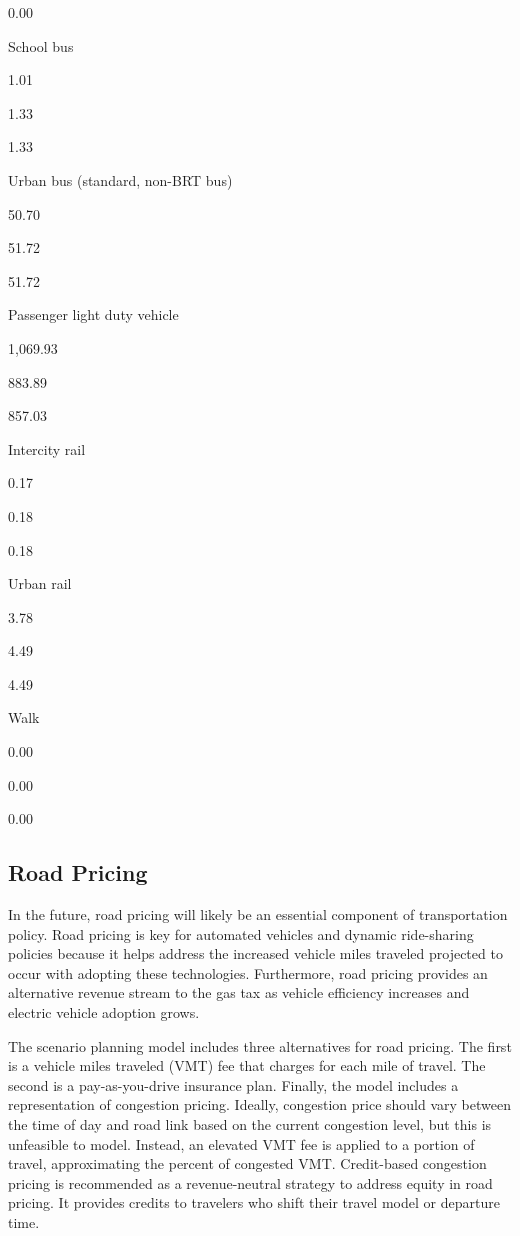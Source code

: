 \documentclass[
]{book}
\begin{document}
0.00

School bus

1.01

1.33

1.33

Urban bus (standard, non-BRT bus)

50.70

51.72

51.72

Passenger light duty vehicle

1,069.93

883.89

857.03

Intercity rail

0.17

0.18

0.18

Urban rail

3.78

4.49

4.49

Walk

0.00

0.00

0.00

\hypertarget{road-pricing}{%
\subsection{Road Pricing}\label{road-pricing}}

In the future, road pricing will likely be an essential component of transportation policy. Road pricing is key for automated vehicles and dynamic ride-sharing policies because it helps address the increased vehicle miles traveled projected to occur with adopting these technologies. Furthermore, road pricing provides an alternative revenue stream to the gas tax as vehicle efficiency increases and electric vehicle adoption grows.

The scenario planning model includes three alternatives for road pricing. The first is a vehicle miles traveled (VMT) fee that charges for each mile of travel. The second is a pay-as-you-drive insurance plan. Finally, the model includes a representation of congestion pricing. Ideally, congestion price should vary between the time of day and road link based on the current congestion level, but this is unfeasible to model. Instead, an elevated VMT fee is applied to a portion of travel, approximating the percent of congested VMT. Credit-based congestion pricing is recommended as a revenue-neutral strategy to address equity in road pricing. It provides credits to travelers who shift their travel model or departure time.
\end{document}
